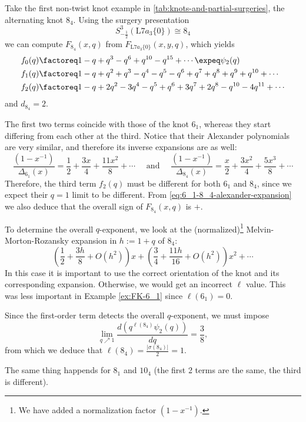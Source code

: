 \documentclass[11pt,e-only]{amsart}
\begin{document}
\begin{example} Take the first non-twist knot example in \cref{tab:knots-and-partial-surgeries}, the alternating knot $8_4$. Using the surgery presentation
\begin{equation}
    S^3_{-\frac12}\left(\mathrm{L}7a_3\{0\}\right)\cong 8_4
\end{equation}
we can compute $F_{8_4}(x,q)$ from $F_{\mathrm{L}7a_3\{0\}}(x,y,q)$, which yields
\begin{equation}
\begin{split}
    f_0(q)&\factoreq 1 - q + q^3 - q^6 + q^{10} - q^{15} + \cdots \expeq \psi_2(q) \\
    f_1(q)&\factoreq 1 - q + q^2 + q^3 - q^4 - q^5 - q^6 + q^7 + q^8 + q^9 + q^{10} + \cdots \\
    f_2(q) &\factoreq 1 - q + 2 q^2 - 3 q^4 - q^5 + q^6 + 3 q^7 + 2 q^8 - q^{10} - 4 q^{11} + \cdots
\end{split}
\end{equation}
and $d_{8_4}=2$. %

The first two terms coincide with those of the knot $6_1$, whereas they start differing from each other at the third. Notice that their Alexander polynomials are very similar, and therefore its inverse expansions are as well:
\begin{equation}\label{eq:6_1-8_4-alexander-expansion}
    \frac{(1-x^{-1})}{\Delta_{6_1}(x)}=\frac12 + \frac{3 x}{4} + \frac{11 x^2}{8}+\cdots \quad \text{ and } \quad \frac{(1-x^{-1})}{\Delta_{8_4}(x)}=\frac{x}{2} + \frac{3 x^2}{4} + \frac{5 x^3}{8}+\cdots
\end{equation}
Therefore, the third term $f_2(q)$ must be different for both $6_1$ and $8_4$, since we expect their $q=1$ limit to be different. From \eqref{eq:6_1-8_4-alexander-expansion} we also deduce that the overall sign of $F_{8_4}(x,q)$ is $+$. 

To determine the overall $q$-exponent, we look at the (normalized)\footnote{We have added a normalization factor $(1-x^{-1})$.} Melvin-Morton-Rozansky expansion in $h:=1+q$ of $8_4$:
\begin{equation}
   \left(\frac12+ \frac{3h}{8}+O(h^2)\right) x + \left(\frac34 + \frac{11 h}{16}+O(h^2)\right) x^2 + \cdots
\end{equation}
In this case it is important to use the correct orientation of the knot and its corresponding expansion. Otherwise, we would get an incorrect $\ell$ value. This was less important in Example \ref{ex:FK-6_1} since $\ell(6_1)=0$.

Since the first-order term detects the overall $q$-exponent, we must impose
\begin{equation}
    \lim_{q\nearrow 1}\frac{d\left(q^{\ell(8_4)}\psi_2(q)\right)}{dq} = \frac{3}{8},
\end{equation}
from which we deduce that $\ell(8_4)=\frac{|\sigma(8_4)|}{2}=1$. 

The same thing happends for $8_1$ and $10_4$ (the first 2 terms are the same, the third is different).
\end{example}
\end{document}
